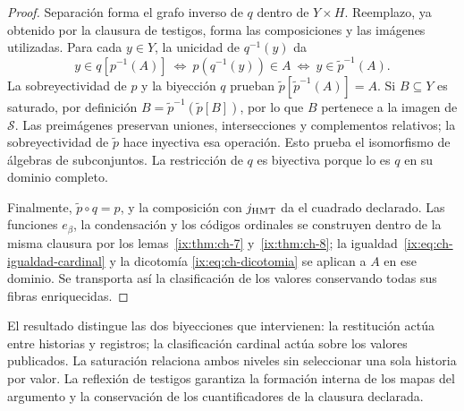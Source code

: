\begin{proof}
Separación forma el grafo inverso de \(q\) dentro de \(Y\times H\).
Reemplazo, ya obtenido por la clausura de testigos, forma las composiciones
y las imágenes utilizadas. Para cada \(y\in Y\), la unicidad de
\(q^{-1}(y)\) da
\[
 y\in q[p^{-1}(A)]
 \ \Longleftrightarrow\ p(q^{-1}(y))\in A
 \ \Longleftrightarrow\ y\in\widetilde p^{-1}(A).
\]
La sobreyectividad de \(p\) y la biyección \(q\) prueban
\(\widetilde p[\widetilde p^{-1}(A)]=A\). Si \(B\subseteq Y\)
es saturado, por definición
\(B=\widetilde p^{-1}(\widetilde p[B])\), por lo que \(B\)
pertenece a la imagen de \(\mathcal S\). Las preimágenes preservan
uniones, intersecciones y complementos relativos; la sobreyectividad de
\(\widetilde p\) hace inyectiva esa operación. Esto prueba el
isomorfismo de álgebras de subconjuntos. La restricción de \(q\) es
biyectiva porque lo es \(q\) en su dominio completo.

Finalmente, \(\widetilde p\circ q=p\), y la composición con
\(j_{\rm HMT}\) da el cuadrado declarado. Las funciones \(e_\beta\),
la condensación y los códigos ordinales se construyen dentro de la misma
clausura por los lemas~\ref{ix:thm:ch-7} y~\ref{ix:thm:ch-8}; la
igualdad~\eqref{ix:eq:ch-igualdad-cardinal} y la dicotomía
\eqref{ix:eq:ch-dicotomia} se aplican a \(A\) en ese dominio. Se
transporta así la clasificación de los valores conservando todas sus
fibras enriquecidas.
\end{proof}

El resultado distingue las dos biyecciones que intervienen: la restitución
actúa entre historias y registros; la clasificación cardinal actúa sobre
los valores publicados. La saturación relaciona ambos niveles sin
seleccionar una sola historia por valor. La reflexión de testigos garantiza
la formación interna de los mapas del argumento y la conservación de los
cuantificadores de la clausura declarada.
